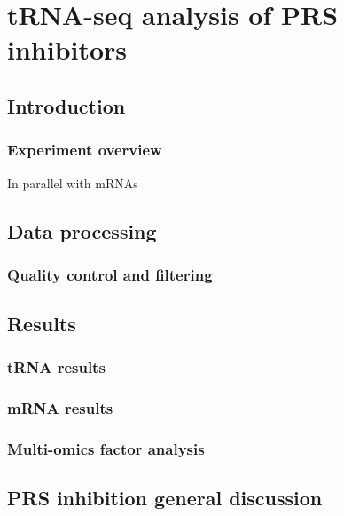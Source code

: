 \chapter{\label{ch:7-trna}tRNA-seq analysis of PRS inhibitors}

\section{Introduction}


\subsection{Experiment overview}
In parallel with mRNAs

\section{Data processing}

\subsection{Quality control and filtering}

\section{Results}

\subsection{tRNA results}

\subsection{mRNA results}

\subsection{Multi-omics factor analysis}


\section{PRS inhibition general discussion}